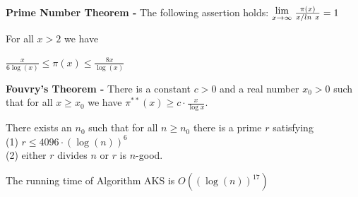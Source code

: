 \documentclass[a4paper]{article}
\newcommand{\Lim}[1]{\raisebox{0.5ex}{{$\displaystyle \lim_{#1}\;$}}}
\begin{document}
\begin{theorem}
\textbf{Prime Number Theorem -} The following assertion holds: $\Lim{x \to \infty}{\frac{\pi (x)}{x/ ln\ x}} = 1$
\end{theorem}


\begin{theorem}
For all $x > 2$ we have 
\begin{center}
$\frac{x}{6\log(x)} \leq \pi (x) \leq \frac{8x}{\log(x)}$
\end{center}
\end{theorem}


\begin{theorem}
\textbf{Fouvry's Theorem -} There is a constant $c > 0$ and a real number $x_{0} > 0 $ such that for all $x \geq x_{0}$ we have $\pi^{**} (x) \geq c \cdot \frac{x}{\log{x}}$.
\end{theorem}


\begin{lemma}
There exists an $n_{0}$ such that for all $n \geq n_{0}$ there is a prime $r$ satisfying\\
(1) $r \leq 4096 \cdot (\log(n))^{6}$ \\
(2) either $r$ divides $n$ or $r$ is $n$-good.
\end{lemma}


\begin{theorem}
The running time of Algorithm AKS is $O\left( (\log(n))^{17} \right)$
\end{theorem}
\end{document}
